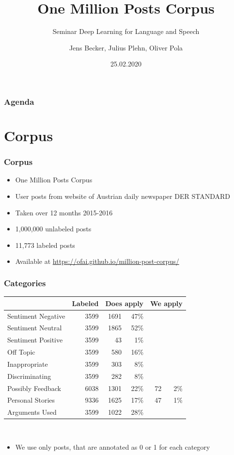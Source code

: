 \documentclass[compress,aspectratio=169]{beamer} %
\title{One Million Posts Corpus}
\subtitle{Seminar Deep Learning for Language and Speech}
\author{Jens Becker, Julius Plehn, Oliver Pola}
\institute{Language Technology Group\\Fachbereich Informatik\\Fakultät für Mathematik, Informatik und Naturwissenschaften\\Universität Hamburg}
\date{25.02.2020}
\begin{document}
\begin{frame}
	\titlepage
\end{frame}

\begin{frame}
	\frametitle{Agenda}

	\tableofcontents[hidesubsections]
\end{frame}


\section{Corpus}

\begin{frame}[fragile]
	\frametitle{Corpus}
	\begin{itemize}
		\item One Million Posts Corpus
		\item User posts from website of Austrian daily newspaper DER STANDARD
		\item Taken over 12 months 2015-2016 
		\item 1,000,000 unlabeled posts
		\item 11,773 labeled posts
		\item Available at \url{https://ofai.github.io/million-post-corpus/}
	\end{itemize}
	\hfill\tiny\cite{Schabus17, Schabus18}
\end{frame}

\begin{frame}[fragile]
	\frametitle{Categories}
	\centering
	\begin{tabular}{l r r r r r}
		& Labeled & \multicolumn{2}{c}{Does apply} & \multicolumn{2}{c}{We apply} \\
		\hline
		Sentiment Negative & 3599 & 1691 & 47\% \\
		Sentiment Neutral & 3599 & 1865 & 52\% \\
		Sentiment Positive & 3599 & 43 & 1\% \\
		Off Topic & 3599 & 580 & 16\% \\
		Inappropriate & 3599 & 303 & 8\%\\
		Discriminating & 3599 & 282 & 8\%\\
		Possibly Feedback & 6038 & 1301 & 22\% & 72 & 2\%\\
		Personal Stories & 9336 & 1625 & 17\% & 47 & 1\%\\
		Arguments Used & 3599 & 1022 & 28\%\\
	\end{tabular}\\
	{\hfill\tiny\cite{Schabus17}}
	\vspace{5mm}
	\begin{itemize}
		\item We use only posts, that are annotated as 0 or 1 for each category
	\end{itemize}
\end{frame}
\end{document}
